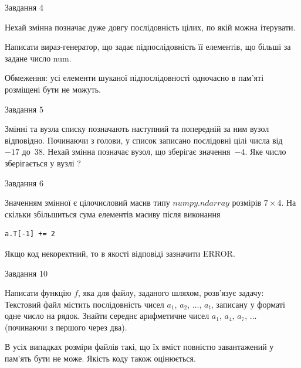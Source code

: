 \documentclass[12pt, ukrainian]{article}
\begin{document}
{               
{\begin{center}Завдання {4}\end{center}}
\vspace{-6mm}
Нехай змінна  позначає дуже довгу послідовність цілих, по якій можна ітерувати.

Написати вираз-генератор, що задає підпослідовність її елементів, що більші за задане число num.

Обмеження: усі елементи шуканої підпослідовності одночасно в пам'яті розміщені бути не можуть.\par

\vspace{10mm}
               
{\begin{center}Завдання {5}\end{center}}
\vspace{-6mm}
Змінні  та  вузла списку позначають наступний та попередній за ним вузол відповідно. Починаючи з голови, у список записано послідовні цілі числа від~$-17$ до~$38$. Нехай змінна  позначає вузол, що зберігає значення~$-4$.
Яке число зберігається у вузлі  ?\par

               
{\begin{center}Завдання {6}\end{center}}
\vspace{-6mm}
Значенням змінної  є цілочисловий масив типу $numpy.ndarray$ розмірів $7{\times}4$. На скільки збільшиться сума елементів масиву  після виконання
\begin{verbatim}
a.T[-1] += 2
\end{verbatim}


Якщо код некоректний, то в якості відповіді зазначити ERROR.\par

               
{\begin{center}Завдання {10}\end{center}}
\vspace{-6mm}

Написати функцію $f$, яка для файлу, заданого шляхом, розв’язує задачу:\\ Текстовий файл містить послідовність чисел $a_1$, $a_2$, $\ldots$, $a_t$, записану у форматі одне число на рядок. Знайти середнє арифметичне чисел $a_1$, $a_4$, $a_7$, $\ldots$ (починаючи з першого через два).

В усіх випадках розміри файлів такі, що їх вміст повністю завантажений у пам'ять бути не може. Якість коду також оцінюється.



}
\end{document}
